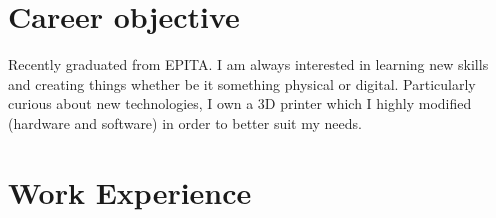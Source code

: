 \documentclass[a4paper,table]{twentysecondcv} %
\begin{document}
\makeprofile{} %


\vspace{-0.1cm}
\begin{center}
\end{center}
\vspace{-0.1cm}

\section{Career objective}

Recently graduated from EPITA. I am always interested in learning new skills
and creating things whether be it something physical or digital. Particularly
curious about new technologies, I own a 3D printer which I highly modified
(hardware and software) in order to better suit my needs.

\section{Work Experience}
\end{document}
